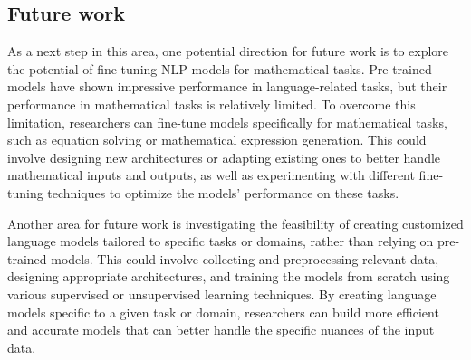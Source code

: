 \documentclass[a0,landscape]{a0poster}
\begin{document}
\begin{multicols}{4}
\color{Teal}
\section*{Future work}
\color{Black}


As a next step in this area, one potential direction for future work is to explore the potential of fine-tuning NLP models for mathematical tasks. Pre-trained models have shown impressive performance in language-related tasks, but their performance in mathematical tasks is relatively limited. To overcome this limitation, researchers can fine-tune models specifically for mathematical tasks, such as equation solving or mathematical expression generation. This could involve designing new architectures or adapting existing ones to better handle mathematical inputs and outputs, as well as experimenting with different fine-tuning techniques to optimize the models' performance on these tasks.


Another area for future work is investigating the feasibility of creating customized language models tailored to specific tasks or domains, rather than relying on pre-trained models. This could involve collecting and preprocessing relevant data, designing appropriate architectures, and training the models from scratch using various supervised or unsupervised learning techniques. By creating language models specific to a given task or domain, researchers can build more efficient and accurate models that can better handle the specific nuances of the input data.





\nocite{*}
\end{multicols}
\end{document}
